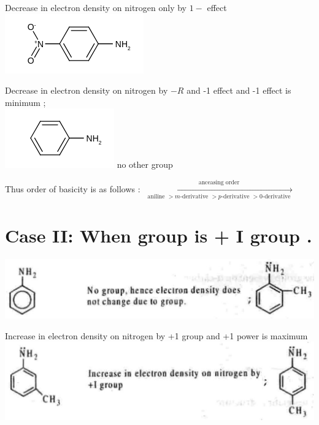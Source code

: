 \documentclass[10pt]{article}
\begin{document}
Decrease in electron density on nitrogen only by $1-$ effect\\
\includegraphics{smile-778d7e701616a9411647b76edd66f115ee8b3bc8}

Decrease in electron density on nitrogen by $-R$ and -1 effect and -1 effect is minimum ;\\
\includegraphics{smile-0ea3cc9af83fd52d18837ca8596d2d15285b2549} no other group

Thus order of basicity is as follows : $\xrightarrow[\text { aniline }>m \text {-derivative }>p \text {-derivative }>0 \text {-derivative }]{\text { anceasing order }}$

\section*{Case II: When group is + I group .}
\begin{center}
\includegraphics[max width=\textwidth]{2025_01_28_8470952b98110cec3aabg-079(3)}
\end{center}

Increase in electron density on nitrogen by +1 group and +1 power is maximum\\
\includegraphics[max width=\textwidth, center]{2025_01_28_8470952b98110cec3aabg-079(4)}
\end{document}
